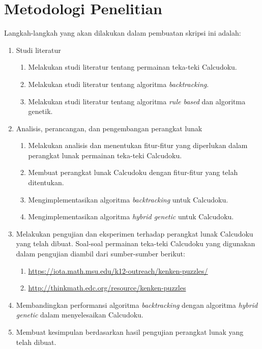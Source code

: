\section{Metodologi Penelitian}
\label{sec:metlit}
Langkah-langkah yang akan dilakukan dalam pembuatan skripsi ini adalah:
\begin{enumerate}
\item Studi literatur
	\begin{enumerate}
	\item Melakukan studi literatur tentang permainan teka-teki Calcudoku.
	\item Melakukan studi literatur tentang algoritma \textit{backtracking}.
	\item Melakukan studi literatur tentang algoritma \textit{rule based} dan algoritma genetik.
	\end{enumerate}
\item Analisis, perancangan, dan pengembangan perangkat lunak
	\begin{enumerate}
	\item Melakukan analisis dan menentukan fitur-fitur yang diperlukan dalam perangkat lunak permainan teka-teki Calcudoku.
	\item Membuat perangkat lunak Calcudoku dengan fitur-fitur yang telah ditentukan. 
	\item Mengimplementasikan algoritma \textit{backtracking} untuk Calcudoku.
	\item Mengimplementasikan algoritma \textit{hybrid genetic} untuk Calcudoku.
	\end{enumerate}
\item Melakukan pengujian dan eksperimen terhadap perangkat lunak Calcudoku yang telah dibuat. Soal-soal permainan teka-teki Calcudoku yang digunakan dalam pengujian diambil dari sumber-sumber berikut:
	\begin{enumerate}
	\item \url{https://iota.math.msu.edu/k12-outreach/kenken-puzzles/}
	\item \url{http://thinkmath.edc.org/resource/kenken-puzzles}
	\end{enumerate}
\item Membandingkan performansi algoritma \textit{backtracking} dengan algoritma \textit{hybrid genetic} dalam menyelesaikan Calcudoku.
\item Membuat kesimpulan berdasarkan hasil pengujian perangkat lunak yang telah dibuat.
\end{enumerate}

